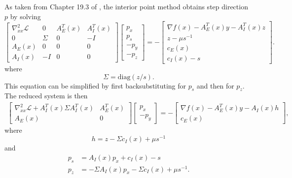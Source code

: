 \documentclass{article}
\begin{document}
As taken from Chapter 19.3 of \cite{NW04}, 
    the interior point method obtains step direction $p$ by solving
\begin{equation}
\begin{bmatrix}
    \nabla^2_{xx}\mathcal{L} & 0 & A_E^T(x) & A_I^T(x) \\
    0 & \Sigma & 0 & -I \\
    A_E(x) & 0 & 0 & 0 \\
    A_I(x) & -I & 0 & 0
\end{bmatrix}
\begin{bmatrix} p_x \\ p_s \\ -p_y \\ -p_z \end{bmatrix}
    = -
\begin{bmatrix}
    \nabla f(x) - A_E^T(x) y - A_I^T(x) z \\
    z - \mu s^{-1} \\
    c_E(x) \\
    c_I(x) - s
\end{bmatrix}.
\end{equation}
    where 
\begin{equation} \Sigma = \text{diag}(z/s).\end{equation}
This equation can be simplified by 
    first backsubstituting for $p_s$ and then for $p_z$.
The reduced system is then
\begin{multline}
\begin{bmatrix}
    \nabla^2_{xx}\mathcal{L} + A_I^T(x) \Sigma A_I^T(x) & A_E^T(x) \\
    A_E(x) & 0 
\end{bmatrix}
\begin{bmatrix} p_x \\ -p_y \end{bmatrix}
    = -
\begin{bmatrix}
    \nabla f(x) - A_E^T(x) y - A_I(x) h \\
    c_E(x)
\end{bmatrix},
\end{multline}
    where 
\begin{equation} h = z - \Sigma c_I(x) + \mu s^{-1} \end{equation} 
    and
\begin{subequations}\begin{align}
    p_s &= A_I(x) p_x + c_I(x) - s \\
    p_z &= -\Sigma A_I(x) p_x - \Sigma c_I(x) + \mu s^{-1}.
\end{align}\end{subequations}
\end{document}
